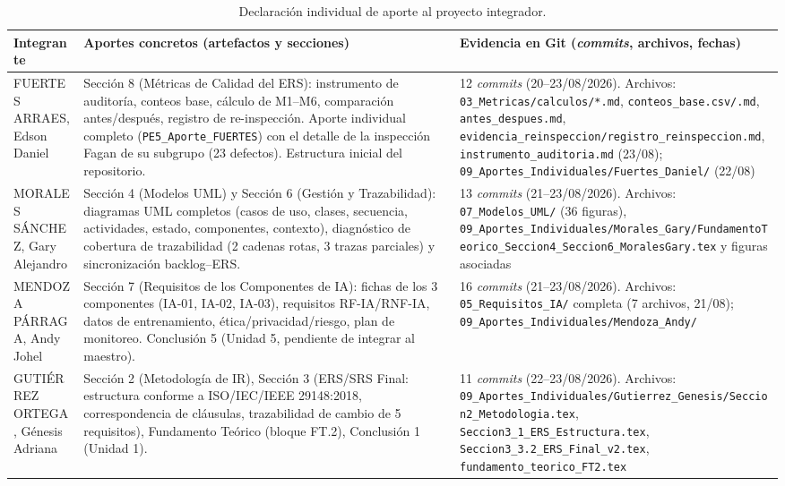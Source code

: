 \documentclass[journal,onecolumn]{IEEEtran}
\newcommand{\rFUE}{FUERTES ARRAES, Edson Daniel}
\newcommand{\rGUT}{GUTIÉRREZ ORTEGA, Génesis Adriana}
\newcommand{\rMEN}{MENDOZA PÁRRAGA, Andy Johel}
\newcommand{\rMOR}{MORALES SÁNCHEZ, Gary Alejandro}
\begin{document}
	\begin{table}[H]
		\caption{Declaración individual de aporte al proyecto integrador.}
		\label{tab:aporte}
		\small
		\begin{tabularx}{\textwidth}{|L{3.4cm}|X|L{4cm}|}
			\hline
			\textbf{Integrante} & \textbf{Aportes concretos (artefactos y secciones)} & \textbf{Evidencia en Git (\textit{commits}, archivos, fechas)} \\
			\hline
			\rFUE &
			Sección 8 (Métricas de Calidad del ERS): instrumento de auditoría, conteos base, cálculo de M1--M6, comparación antes/después, registro de re-inspección. Aporte individual completo (\texttt{PE5\_Aporte\_FUERTES}) con el detalle de la inspección Fagan de su subgrupo (23 defectos). Estructura inicial del repositorio. &
			12 \textit{commits} (20--23/08/2026). Archivos: \texttt{03\_Metricas/calculos/*.md}, \texttt{conteos\_base.csv/.md}, \texttt{antes\_despues.md}, \texttt{evidencia\_reinspeccion/registro\_reinspeccion.md}, \texttt{instrumento\_auditoria.md} (23/08); \texttt{09\_Aportes\_Individuales/Fuertes\_Daniel/} (22/08) \\
			\hline
			\rMOR &
			Sección 4 (Modelos UML) y Sección 6 (Gestión y Trazabilidad): diagramas UML completos (casos de uso, clases, secuencia, actividades, estado, componentes, contexto), diagnóstico de cobertura de trazabilidad (2 cadenas rotas, 3 trazas parciales) y sincronización backlog--ERS. &
			13 \textit{commits} (21--23/08/2026). Archivos: \texttt{07\_Modelos\_UML/} (36 figuras), \texttt{09\_Aportes\_Individuales/Morales\_Gary/FundamentoTeorico\_Seccion4\_Seccion6\_MoralesGary.tex} y figuras asociadas \\
			\hline
			\rMEN &
			Sección 7 (Requisitos de los Componentes de IA): fichas de los 3 componentes (IA-01, IA-02, IA-03), requisitos RF-IA/RNF-IA, datos de entrenamiento, ética/privacidad/riesgo, plan de monitoreo. Conclusión 5 (Unidad 5, pendiente de integrar al maestro). &
			16 \textit{commits} (21--23/08/2026). Archivos: \texttt{05\_Requisitos\_IA/} completa (7 archivos, 21/08); \texttt{09\_Aportes\_Individuales/Mendoza\_Andy/} \\
			\hline
			\rGUT &
			Sección 2 (Metodología de IR), Sección 3 (ERS/SRS Final: estructura conforme a ISO/IEC/IEEE 29148:2018, correspondencia de cláusulas, trazabilidad de cambio de 5 requisitos), Fundamento Teórico (bloque FT.2), Conclusión 1 (Unidad 1). &
			11 \textit{commits} (22--23/08/2026). Archivos: \texttt{09\_Aportes\_Individuales/Gutierrez\_Genesis/Seccion2\_Metodologia.tex}, \texttt{Seccion3\_1\_ERS\_Estructura.tex}, \texttt{Seccion3\_3.2\_ERS\_Final\_v2.tex}, \texttt{fundamento\_teorico\_FT2.tex} \\

\end{tabularx}
\end{table}
\end{document}

